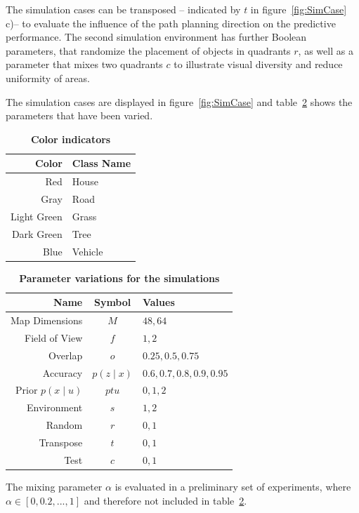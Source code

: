 \documentclass[twocolumn,letterpaper]{IEEEAerospaceCLS}  %
\begin{document}
The simulation cases can be transposed -- indicated by $t$ in figure~\ref{fig:SimCase} c)-- to evaluate the influence of the path planning direction on the predictive performance. The second simulation environment has further Boolean parameters, that randomize the placement of objects in quadrants $r$, as well as a parameter that mixes two quadrants $c$ to illustrate visual diversity and reduce uniformity of areas.

The simulation cases are displayed in figure~\ref{fig:SimCase} and table~\ref{tab:params} shows the parameters that have been varied.
\begin{table}[]
    \renewcommand{\arraystretch}{1.3}
    \caption{\bf Color indicators}
    \label{tab:colors}
    \centering
    \begin{tabular}{|r||l|}
        \hline
        \bfseries Color      & \bfseries Class Name    \\
        \hline \hline
        Red &  House\\
        \hline
        Gray  & Road         \\
        \hline
        Light Green     & Grass              \\
        \hline
        Dark Green & Tree           \\
        \hline
        Blue & Vehicle \\
        \hline
    \end{tabular}
\end{table}
\begin{table}[]
    \renewcommand{\arraystretch}{1.3}
    \caption{\bf Parameter variations for the simulations}
    \label{tab:params}
    \centering
    \begin{tabular}{|r||c|l|}
        \hline
        \bfseries Name      & \bfseries Symbol & \bfseries Values       \\
        \hline \hline
        Map Dimensions & $M$ & $48, 64$\\
        \hline
        Field of View  & $f$              & $1, 2$ \\
        \hline
        Overlap     & $o$              & $0.25, 0.5, 0.75$         \\
        \hline
        Accuracy & $p(z\mid x)$              & $0.6, 0.7, 0.8, 0.9, 0.95$        \\
        \hline
        Prior $p(x\mid u)$ & $ptu$ & $0, 1, 2$ \\
        \hline
        Environment & $s$ & $1, 2$ \\
        \hline
        Random & $r$ & $0, 1$ \\
        \hline
        Transpose & $t$ & $0, 1$  \\
        \hline
        Test & $c$ & $0, 1$  \\
        \hline
    \end{tabular}
\end{table}
The mixing parameter $\alpha$ is evaluated in a preliminary set of experiments, where $\alpha \in [0, 0.2, ..., 1]$ and therefore not included in table~\ref{tab:params}.
\end{document}
